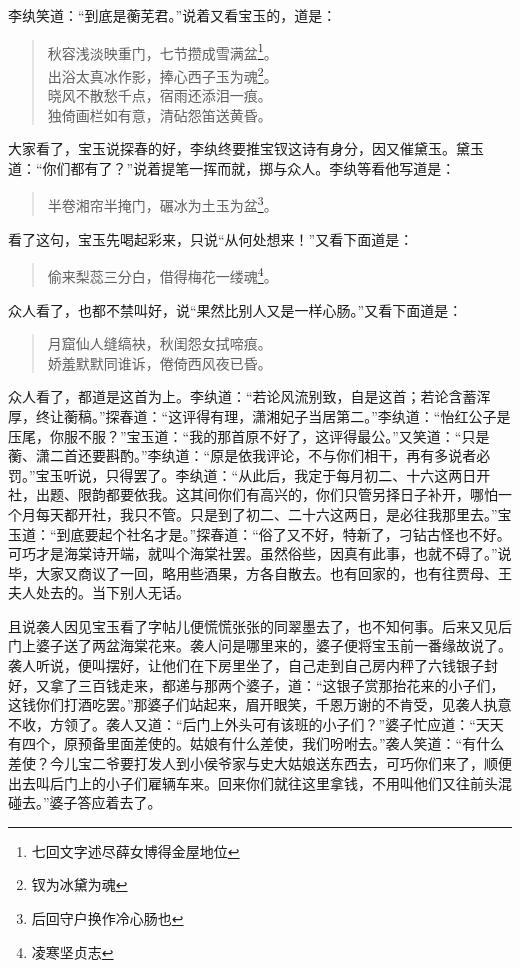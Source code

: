 \documentclass[12pt,oneside]{book}
\newenvironment{shici}{%
\begin{verse}%
\centering\large\hspace{12pt}}%
{\end{verse}}
\begin{document}
李纨笑道：“到底是蘅芜君。”说着又看宝玉的，道是：

\begin{shici}
秋容浅淡映重门，七节攒成雪满盆\footnote{七回文字述尽薛女博得金屋地位}。\\
出浴太真冰作影，捧心西子玉为魂\footnote{钗为冰黛为魂}。\\
晓风不散愁千点，宿雨还添泪一痕。\\
独倚画栏如有意，清砧怨笛送黄昏。
\end{shici}


大家看了，宝玉说探春的好，李纨终要推宝钗这诗有身分，因又催黛玉。黛玉道：“你们都有了？”说着提笔一挥而就，掷与众人。李纨等看他写道是：

\begin{shici}
半卷湘帘半掩门，碾冰为土玉为盆\footnote{后回守户换作冷心肠也}。
\end{shici}


看了这句，宝玉先喝起彩来，只说“从何处想来！”又看下面道是：

\begin{shici}
偷来梨蕊三分白，借得梅花一缕魂\footnote{凌寒坚贞志}。
\end{shici}

众人看了，也都不禁叫好，说“果然比别人又是一样心肠。”又看下面道是：

\begin{shici}
月窟仙人缝缟袂，秋闺怨女拭啼痕。\\
娇羞默默同谁诉，倦倚西风夜已昏。
\end{shici}


众人看了，都道是这首为上。李纨道：“若论风流别致，自是这首；若论含蓄浑厚，终让蘅稿。”探春道：“这评得有理，潇湘妃子当居第二。”李纨道：“怡红公子是压尾，你服不服？”宝玉道：“我的那首原不好了，这评得最公。”又笑道：“只是蘅、潇二首还要斟酌。”李纨道：“原是依我评论，不与你们相干，再有多说者必罚。”宝玉听说，只得罢了。李纨道：“从此后，我定于每月初二、十六这两日开社，出题、限韵都要依我。这其间你们有高兴的，你们只管另择日子补开，哪怕一个月每天都开社，我只不管。只是到了初二、二十六这两日，是必往我那里去。”宝玉道：“到底要起个社名才是。”探春道：“俗了又不好，特新了，刁钻古怪也不好。可巧才是海棠诗开端，就叫个海棠社罢。虽然俗些，因真有此事，也就不碍了。”说毕，大家又商议了一回，略用些酒果，方各自散去。也有回家的，也有往贾母、王夫人处去的。当下别人无话。

且说袭人因见宝玉看了字帖儿便慌慌张张的同翠墨去了，也不知何事。后来又见后门上婆子送了两盆海棠花来。袭人问是哪里来的，婆子便将宝玉前一番缘故说了。袭人听说，便叫摆好，让他们在下房里坐了，自己走到自己房内秤了六钱银子封好，又拿了三百钱走来，都递与那两个婆子，道：“这银子赏那抬花来的小子们，这钱你们打酒吃罢。”那婆子们站起来，眉开眼笑，千恩万谢的不肯受，见袭人执意不收，方领了。袭人又道：“后门上外头可有该班的小子们？”婆子忙应道：“天天有四个，原预备里面差使的。姑娘有什么差使，我们吩咐去。”袭人笑道：“有什么差使？今儿宝二爷要打发人到小侯爷家与史大姑娘送东西去，可巧你们来了，顺便出去叫后门上的小子们雇辆车来。回来你们就往这里拿钱，不用叫他们又往前头混碰去。”婆子答应着去了。
\end{document}
